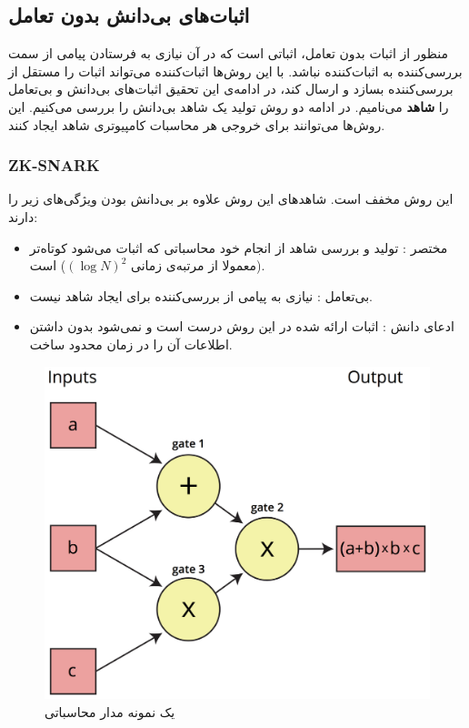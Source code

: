 \subsection{اثبات‌های بی‌دانش بدون تعامل} 
منظور از اثبات بدون تعامل، اثباتی‌ است که در آن نیازی به فرستادن پیامی از سمت بررسی‌کننده به اثبات‌کننده نباشد. با این روش‌ها اثبات‌کننده می‌تواند اثبات را مستقل از بررسی‌کننده بسازد و ارسال کند، در ادامه‌ی این تحقیق اثبات‌های بی‌دانش و بی‌تعامل را 
\textbf{شاهد}
می‌نامیم. در ادامه دو روش تولید یک شاهد بی‌دانش را بررسی می‌کنیم. این روش‌ها می‌توانند برای خروجی هر محاسبات کامپیوتری شاهد ایجاد کنند. 

\subsubsection{ZK-SNARK}
این روش مخفف
است. شاهد‌های این روش علاوه بر بی‌دانش بودن ویژگی‌های زیر را دارند:
\begin{itemize}
	\item 
	مختصر
	: تولید و بررسی شاهد از انجام خود محاسباتی که اثبات می‌شود کوتاه‌تر (معمولا از مرتبه‌ی زمانی $ (\log N) ^ 2$) است. 
	\item
	بی‌تعامل
	: نیازی به پیامی از بررسی‌کننده برای ایجاد شاهد نیست. 
	\item
	ادعای دانش
	: اثبات ارائه شده در این روش درست 
	است و نمی‌شود بدون داشتن اطلاعات آن را در زمان محدود ساخت.
	
\end{itemize}
 
\begin{figure}[bh]
	\centering
	\includegraphics[width=.5\linewidth]{arithmetic-circuit.png}
	\caption {یک نمونه مدار محاسباتی}
	\label{fig:arithmetic}
\end{figure}

